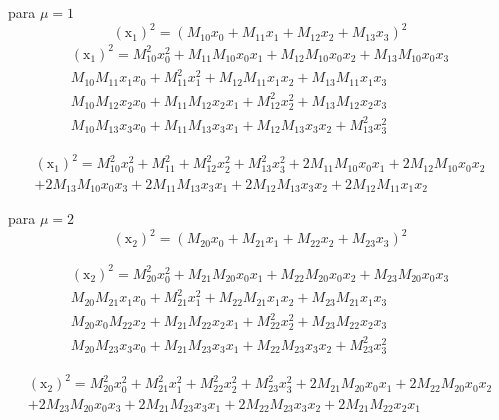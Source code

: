 \documentclass[10pt,a4paper]{article}
\begin{document}
\begin{enumerate}
 	para $ \mu =1 $
 	$$ (\text{\~{x}}_1)^2 = (M_{10} x_0 + M_{11} x_1+M_{12} x_2+M_{13} x_3)^2 $$
 	\begin{equation}\nonumber
 		\begin{split}
 			(\text{\~{x}}_1)^2 = M_{10}^2 x_0^2 + M_{11}M_{10} x_0 x_1+M_{12} M_{10} x_0x_2+M_{13}M_{10} x_0 x_3\\
 			M_{10}M_{11} x_1 x_0 + M_{11}^2 x_1^2+M_{12}M_{11} x_1 x_2+M_{13}M_{11} x_1 x_3\\
 			M_{10}M_{12} x_2 x_0 + M_{11}M_{12} x_2 x_1+M_{12}^2 x_2^2+M_{13}M_{12} x_2 x_3\\
 			M_{10}M_{13} x_3x_0 + M_{11}M_{13} x_3 x_1+M_{12} M_{13} x_3x_2+M_{13}^2 x_3^2
 		\end{split}
 	\end{equation}
 
 	\begin{equation}\nonumber
 		\begin{split}
 			(\text{\~{x}}_1)^2 = M_{10}^2 x_0^2 + M_{11}^2+M_{12}^2 x_2^2+M_{13}^2 x_3^2+2M_{11}M_{10} x_0 x_1+2M_{12} M_{10} x_0x_2\\+2M_{13}M_{10} x_0 x_3+2M_{11}M_{13} x_3 x_1+2M_{12} M_{13} x_3x_2+2M_{12}M_{11} x_1 x_2
 		\end{split}
 	\end{equation}
	
	para $ \mu =2 $
	$$( \text{\~{x}}_2)^2 = (M_{20} x_0 + M_{21} x_1+M_{22} x_2+M_{23} x_3)^2 $$
	
	\begin{equation}\nonumber
		\begin{split}
			( \text{\~{x}}_2)^2 = M_{20}^2 x_0^2 + M_{21}M_{20} x_0 x_1+M_{22} M_{20} x_0x_2+M_{23} M_{20} x_0x_3\\
			M_{20}M_{21} x_1 x_0 + M_{21}^2 x_1^2+M_{22} M_{21} x_1x_2+M_{23}M_{21} x_1 x_3\\
			M_{20} x_0 M_{22} x_2+ M_{21} M_{22} x_2x_1+M_{22}^2 x_2^2+M_{23} M_{22} x_2x_3\\
			M_{20}M_{23} x_3 x_0 + M_{21} M_{23} x_3x_1+M_{22}M_{23} x_3 x_2+M_{23}^2 x_3^2	
		\end{split}
	\end{equation}

\begin{equation}\nonumber
	\begin{split}
		( \text{\~{x}}_2)^2 = M_{20}^2 x_0^2 + M_{21}^2 x_1^2+M_{22}^2 x_2^2+M_{23}^2 x_3^2	+2 M_{21}M_{20} x_0 x_1+2M_{22} M_{20}
		 x_0x_2\\+2M_{23} M_{20} x_0x_3+2M_{21} M_{23} x_3x_1+2M_{22}M_{23} x_3 x_2+2 M_{21} M_{22} x_2x_1
	\end{split}
\end{equation}


\end{enumerate}
\end{document}
